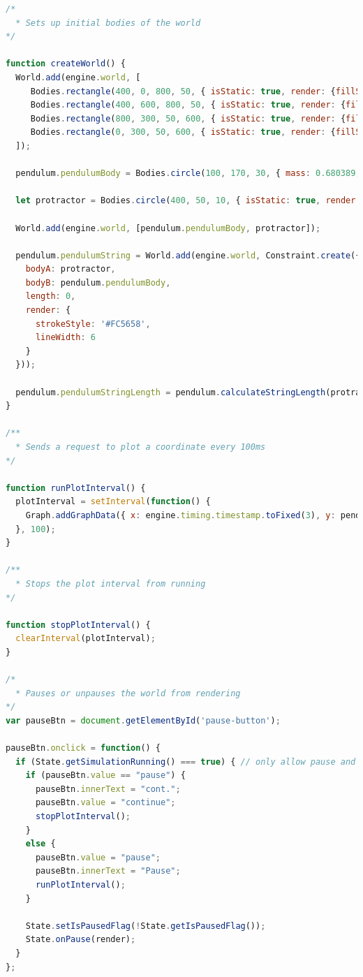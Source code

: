 \documentclass[onecolumn, draftclsnofoot,10pt, compsoc]{IEEEtran}
\begin{document}
\begin{lstlisting}[language=JavaScript]
/*
  * Sets up initial bodies of the world
*/

function createWorld() {
  World.add(engine.world, [
     Bodies.rectangle(400, 0, 800, 50, { isStatic: true, render: {fillStyle: 'grey'} }),
     Bodies.rectangle(400, 600, 800, 50, { isStatic: true, render: {fillStyle: 'grey'} }),
     Bodies.rectangle(800, 300, 50, 600, { isStatic: true, render: {fillStyle: 'grey'} }),
     Bodies.rectangle(0, 300, 50, 600, { isStatic: true, render: {fillStyle: 'grey'} })
  ]);

  pendulum.pendulumBody = Bodies.circle(100, 170, 30, { mass: 0.680389, frictionAir: 0, interia: Infinity, render: {fillStyle: '#FC5658'} }); // Light red

  let protractor = Bodies.circle(400, 50, 10, { isStatic: true, render: {fillStyle: 'grey'}});

  World.add(engine.world, [pendulum.pendulumBody, protractor]);

  pendulum.pendulumString = World.add(engine.world, Constraint.create({
    bodyA: protractor,
    bodyB: pendulum.pendulumBody,
    length: 0,
    render: {
      strokeStyle: '#FC5658',
      lineWidth: 6
    }
  }));

  pendulum.pendulumStringLength = pendulum.calculateStringLength(protractor.position, pendulum.pendulumBody.position);
}

/**
  * Sends a request to plot a coordinate every 100ms
*/

function runPlotInterval() {
  plotInterval = setInterval(function() {
    Graph.addGraphData({ x: engine.timing.timestamp.toFixed(3), y: pendulum.pendulumHeight.toFixed(3) },0);
  }, 100);
}

/**
  * Stops the plot interval from running
*/

function stopPlotInterval() {
  clearInterval(plotInterval);
}

/*
  * Pauses or unpauses the world from rendering
*/
var pauseBtn = document.getElementById('pause-button');

pauseBtn.onclick = function() {
  if (State.getSimulationRunning() === true) { // only allow pause and continue when the simulation is running
    if (pauseBtn.value == "pause") {
      pauseBtn.innerText = "cont.";
      pauseBtn.value = "continue";
      stopPlotInterval();
    }
    else {
      pauseBtn.value = "pause";
      pauseBtn.innerText = "Pause";
      runPlotInterval();
    }

    State.setIsPausedFlag(!State.getIsPausedFlag());
    State.onPause(render);
  }
};


\end{lstlisting}
\end{document}
